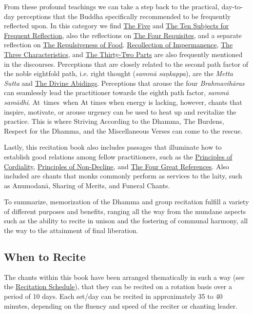 From these profound teachings we can take a step back to the practical, day-to-day perceptions that the Buddha specifically recommended to be frequently reflected upon. In this category we find \hyperref[five-reflections]{The Five} and \hyperref[ten-reflections]{The Ten Subjects for Frequent Reflection}, also the reflections on \hyperref[four-requisites]{The Four Requisites}, and a separate reflection on \hyperref[repulsiveness-of-food]{The Repulsiveness of Food}. \hyperref[recollection-of-impermanence]{Recollection of Impermanence}, \hyperref[three-characteristics]{The Three Characteristics}, and \hyperref[32-parts]{The Thirty-Two Parts} are also frequently mentioned in the discourses. Perceptions that are closely related to the second path factor of the noble eightfold path, i.e. right thought (\textit{sammā saṇkappa}), are the \textit{Metta Sutta} and \hyperref[divine-abidings]{The Divine Abidings}. Perceptions that arouse the four \textit{Brahmavihāras} can seamlessly lead the practitioner towards the eighth path factor, \textit{sammā samādhi}. \ifninebythirteenversion \mbox{At times}~when \else At times when \fi energy is lacking, however, chants that inspire, motivate, or arouse urgency can be used to heat up and revitalize the practice. This is where Striving According to the Dhamma, The Burdens, Respect for the Dhamma, and the Miscellaneous Verses can come to the rescue.

Lastly, this recitation book also includes passages that illuminate how to establish good relations among fellow practitioners, such as the \hyperref[principles-of-cordiality]{Principles of Cordiality}, \hyperref[principles-of-non-decline]{Principles of Non-Decline}, and \hyperref[four-great-references]{The Four Great References}. Also included are chants that monks commonly perform as services to the laity, such as Anumodanā, Sharing of Merits, and Funeral Chants.

To summarize, memorization of the Dhamma and group recitation fulfill a variety of different purposes and benefits, ranging all the way from the mundane aspects such as the ability to recite in unison and the fostering of communal harmony, all the way to the attainment of final liberation.

\subsection*{When to Recite}

The chants within this book have been arranged thematically in such a way (see the \hyperref[schedule]{Recitation Schedule}), that they can be recited on a rotation basis over a period of 10 days. Each set/day can be recited in approximately 35 to 40 minutes, depending on the fluency and speed of the reciter or chanting leader.

